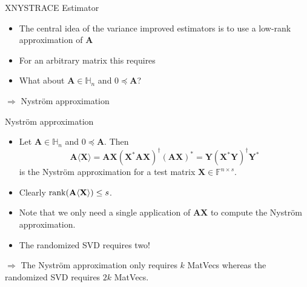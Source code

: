 \documentclass{beamer}
\newcommand{\bvec}[1]{\mathbf{#1}}
\newcommand{\vA}{\bvec{A}}
\newcommand{\vX}{\bvec{X}}
\newcommand{\vY}{\bvec{Y}}
\newcommand{\bitem}{\item[$\bullet$]}
\begin{document}
\begin{frame}{XN{\small YS}T{\small RACE} Estimator}

\begin{itemize}
    \bitem The central idea of the variance improved estimators is to use a low-rank approximation of $\vA$
    \bitem For an arbitrary matrix this requires 
    \bitem What about $\vA \in \mathbb{H}_n$ and $0\preccurlyeq\vA $?
\end{itemize}
\begin{center}
     $\Rightarrow$ Nystr\"om approximation
\end{center}
\end{frame}

\begin{frame}{Nystr\"om approximation}
\begin{itemize}
    \bitem Let $\vA \in \mathbb{H}_n$ and $0\preccurlyeq\vA $. Then 
    $$
    \vA \langle \vX \rangle
    =
    \vA\vX (\vX^* \vA \vX)^{\dagger} (\vA \vX)^*
    =
    \vY (\vX^* \vY)^{\dagger} \vY^*
    $$
    is the Nystr\"om approximation for a test matrix $\vX \in \mathbb{F}^{n\times s}$.
    \bitem Clearly ${\rm rank}(\vA \langle \vX \rangle) \leq s$.
    \bitem Note that we only need a single application of $\vA \vX$ to compute the Nystr\"om approximation.
    \bitem The randomized SVD requires two!
\end{itemize}

\begin{center}
    $\Rightarrow$ The Nystr\"om approximation only requires $k$ MatVecs whereas the randomized SVD requires $2k$ MatVecs.
\end{center}

\end{frame}
\end{document}
